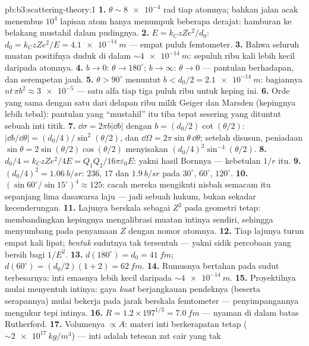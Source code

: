 \begin{solution}{pb:b3:scattering-theory:1}
\textbf{1.} $\theta \sim \num{8e-4}$ rad tiap atomnya; bahkan jalan acak
menembus $10^4$ lapisan atom hanya menumpuk beberapa derajat: hamburan
ke belakang mustahil dalam pudingnya.
\textbf{2.} $E = k_CzZe^2/d_0$: $d_0 = k_CzZe^2/E =
\qty{4.1e-14}{m}$ --- empat puluh femtometer.
\textbf{3.} Bahwa seluruh muatan positifnya duduk di dalam
$\sim\qty{4e-14}{m}$: sepuluh ribu kali lebih kecil daripada atomnya.
\textbf{4.} $b \to 0$: $\theta \to 180^\circ$; $b \to \infty$:
$\theta \to 0$ --- pantulan berhadapan, dan serempetan jauh.
\textbf{5.} $\theta > 90^\circ$ menuntut $b < d_0/2 =
\qty{2.1e-14}{m}$: bagiannya $nt\,\pi b^2 \approx \num{3e-5}$ ---
satu alfa tiap tiga puluh ribu untuk keping ini.
\textbf{6.} Orde yang sama dengan satu dari delapan ribu milik Geiger
dan Marsden (kepingnya lebih tebal): pantulan yang ``mustahil'' itu
tiba tepat sesering yang dituntut sebuah inti titik.
\textbf{7.} $\dd\sigma = 2\pi b|\dd b|$ dengan $b =
(d_0/2)\cot(\theta/2)$: $|\dd b/\dd\theta| = (d_0/4)/\sin^2(
\theta/2)$, dan $\dd\Omega = 2\pi\sin\theta\,\dd\theta$;
setelah disusun, peniadaan $\sin\theta = 2\sin(\theta/2)\cos(\theta/2)$
menyisakan $(d_0/4)^2\sin^{-4}(\theta/2)$.
\textbf{8.} $d_0/4 = k_CzZe^2/4E = Q_1Q_2/16\pi\varepsilon_0E$:
yakni hasil Bornnya --- kebetulan $1/r$ itu.
\textbf{9.} $(d_0/4)^2 = \qty{1.06}{b/sr}$: $236$, $17$ dan
$\qty{1.9}{b/sr}$ pada $30^\circ$, $60^\circ$, $120^\circ$.
\textbf{10.} $(\sin60^\circ/\sin15^\circ)^4 \approx 125$: cacah mereka
mengikuti nisbah semacam itu sepanjang lima dasawarsa laju --- jadi
sebuah hukum, bukan sekadar kecenderungan.
\textbf{11.} Lajunya berskala sebagai $Z^2$ pada geometri tetap:
membandingkan kepingnya mengalibrasi muatan intinya sendiri, sehingga
menyumbang pada penyamaan $Z$ dengan nomor atomnya.
\textbf{12.} Tiap lajunya turun empat kali lipat; \emph{bentuk} sudutnya
tak tersentuh --- yakni sidik percobaan yang bersih bagi $1/E^2$.
\textbf{13.} $d(180^\circ) = d_0 = \qty{41}{fm}$; $d(60^\circ) =
(d_0/2)(1 + 2) = \qty{62}{fm}$.
\textbf{14.} Rumusnya bertahan pada sudut terbesarnya: inti emasnya
lebih kecil daripada $\sim\qty{4e-14}{m}$.
\textbf{15.} Proyektilnya mulai menyentuh intinya: gaya \emph{kuat}
berjangkauan pendeknya (beserta serapannya) mulai bekerja pada jarak
berskala femtometer --- penyimpangannya mengukur tepi intinya.
\textbf{16.} $R = 1.2 \times 197^{1/3} = \qty{7.0}{fm}$ ---
nyaman di dalam batas Rutherford.
\textbf{17.} Volumenya $\propto A$: materi inti berkerapatan tetap
($\sim\qty{2e17}{kg/m^3}$) --- inti adalah tetesan zat cair yang tak

\end{solution}
